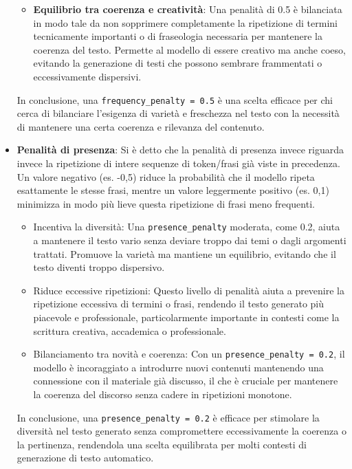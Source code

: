 \begin{itemize}
\begin{itemize}
                \item \textbf{Equilibrio tra coerenza e creatività}: Una penalità di 0.5 è bilanciata in modo tale da non sopprimere completamente la ripetizione di termini tecnicamente importanti o di fraseologia necessaria per mantenere la coerenza del testo. Permette al modello di essere creativo ma anche coeso, evitando la generazione di testi che possono sembrare frammentati o eccessivamente dispersivi.
            \end{itemize}
        
            In conclusione, una \texttt{frequency\_penalty = 0.5} è una scelta efficace per chi cerca di bilanciare l'esigenza di varietà e freschezza nel testo con la necessità di mantenere una certa coerenza e rilevanza del contenuto.

        \item
            \textbf{Penalità di presenza}: Si è detto che la penalità di presenza invece riguarda invece la ripetizione di intere sequenze di token/frasi già viste in precedenza. Un valore negativo (es. -0,5) riduce la probabilità che il modello ripeta esattamente le stesse frasi, mentre un valore leggermente positivo (es. 0,1) minimizza in modo più lieve questa ripetizione di frasi meno frequenti.
            \begin{itemize}
                \item Incentiva la diversità: Una \texttt{presence\_penalty} moderata, come 0.2, aiuta a mantenere il testo vario senza deviare troppo dai temi o dagli argomenti trattati. Promuove la varietà ma mantiene un equilibrio, evitando che il testo diventi troppo dispersivo.
                    
                \item Riduce eccessive ripetizioni: Questo livello di penalità aiuta a prevenire la ripetizione eccessiva di termini o frasi, rendendo il testo generato più piacevole e professionale, particolarmente importante in contesti come la scrittura creativa, accademica o professionale.
                    
                \item Bilanciamento tra novità e coerenza: Con un \texttt{presence\_penalty = 0.2}, il modello è incoraggiato a introdurre nuovi contenuti mantenendo una connessione con il materiale già discusso, il che è cruciale per mantenere la coerenza del discorso senza cadere in ripetizioni monotone.
            \end{itemize}
        
            In conclusione, una \texttt{presence\_penalty = 0.2} è efficace per stimolare la diversità nel testo generato senza compromettere eccessivamente la coerenza o la pertinenza, rendendola una scelta equilibrata per molti contesti di generazione di testo automatico.
        \end{itemize}
        
